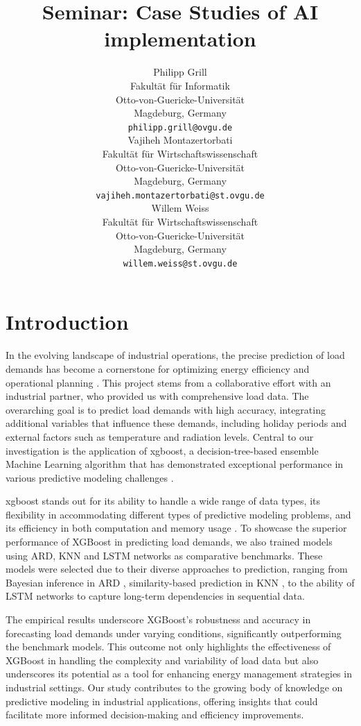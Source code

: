 \documentclass{article} %
\title{Seminar:
Case Studies of AI implementation }
\author{
Philipp Grill \\
Fakultät für Informatik\\
Otto-von-Guericke-Universität\\
Magdeburg, Germany \\
\texttt{philipp.grill@ovgu.de} \\
\And
Vajiheh Montazertorbati \\
Fakultät für Wirtschaftswissenschaft\\
Otto-von-Guericke-Universität\\
Magdeburg, Germany \\
\texttt{vajiheh.montazertorbati@st.ovgu.de} \\
\And
Willem Weiss \\
Fakultät für Wirtschaftswissenschaft\\
Otto-von-Guericke-Universität\\
Magdeburg, Germany \\
\texttt{willem.weiss@st.ovgu.de} \\
}
\begin{document}
\maketitle

\section{Introduction}
In the evolving landscape of industrial operations, the precise prediction of load demands has become a cornerstone for optimizing energy efficiency and operational planning \cite{semmelmann2022load}. This project stems from a collaborative effort with an industrial partner, who provided us with comprehensive load data. The overarching goal is to predict load demands with high accuracy, integrating additional variables that influence these demands, including holiday periods and external factors such as temperature and radiation levels. Central to our investigation is the application of \gls{xgboost}, a decision-tree-based ensemble Machine Learning algorithm that has demonstrated exceptional performance in various predictive modeling challenges \cite{chen2015xgboost}. 

\Gls{xgboost} stands out for its ability to handle a wide range of data types, its flexibility in accommodating different types of predictive modeling problems, and its efficiency in both computation and memory usage \cite{budholiya2022optimized}. To showcase the superior performance of XGBoost in predicting load demands, we also trained models using \gls{ARD}, \gls{KNN} and \gls{LSTM} networks \cite{hochreiter1997long} as comparative benchmarks. These models were selected due to their diverse approaches to prediction, ranging from Bayesian inference in \gls{ARD} \cite{qi2004predictive}, similarity-based prediction in \gls{KNN} \cite{cover1967nearest}, to the ability of \gls{LSTM} networks to capture long-term dependencies in sequential data. 

The empirical results underscore XGBoost's robustness and accuracy in forecasting load demands under varying conditions, significantly outperforming the benchmark models. This outcome not only highlights the effectiveness of XGBoost in handling the complexity and variability of load data but also underscores its potential as a tool for enhancing energy management strategies in industrial settings. Our study contributes to the growing body of knowledge on predictive modeling in industrial applications, offering insights that could facilitate more informed decision-making and efficiency improvements. 
\end{document}
